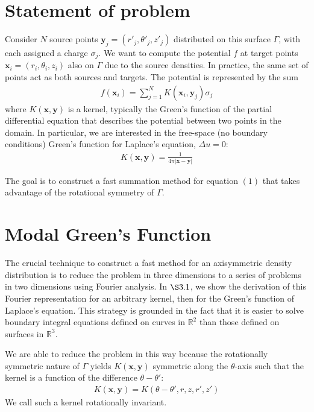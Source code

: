 \documentclass[11pt, oneside]{article}   	%
\begin{document}
\section{Statement of problem}
Consider $N$ source points $\mathbf{y}_j=(r'_j,\theta'_j,z'_j)$ distributed on this surface $\Gamma$, with each assigned a charge $\sigma_j$. We want to compute the potential $f$ at target points $\mathbf{x}_i=(r_i,\theta_i,z_i)$ also on $\Gamma$ due to the source densities.  In practice, the same set of points act as both sources and targets. The potential is represented by the sum
\begin{align}
f(\mathbf{x}_i) = \sum_{j=1}^N K(\mathbf{x}_i,\mathbf{y}_j)\sigma_j
\end{align}
where $K(\mathbf{x},\mathbf{y})$ is a kernel, typically the Green's function of the partial differential equation that describes the potential between two points in the domain. In particular, we are interested in the free-space (no boundary conditions) Green's function for Laplace's equation, $\Delta u = 0$:
\begin{align}
K(\mathbf{x},\mathbf{y}) = \frac{1}{4\pi |\mathbf{x}-\mathbf{y}|}
\end{align}

The goal is to construct a fast summation method for equation $(1)$ that takes advantage of the rotational symmetry of $\Gamma$.

\section{Modal Green's Function}

The crucial technique to construct a fast method for an axisymmetric density distribution is to reduce the problem in three dimensions to a series of problems in two dimensions using Fourier analysis. In $\S3.1$, we show the derivation of this Fourier representation for an arbitrary kernel, then for the Green's function of Laplace's equation. This strategy is grounded in the fact that it is easier to solve boundary integral equations defined on curves in $\mathbb{R}^2$ than those defined on surfaces in $\mathbb{R}^3$.

We are able to reduce the problem in this way because the rotationally symmetric nature of $\Gamma$ yields $K(\mathbf{x},\mathbf{y})$ symmetric along the $\theta$-axis such that the kernel is a function of the difference $\theta-\theta'$:
\begin{align*}
K(\mathbf{x},\mathbf{y})=K(\theta-\theta',r,z,r',z')
\end{align*}
We call such a kernel rotationally invariant.
\end{document}
